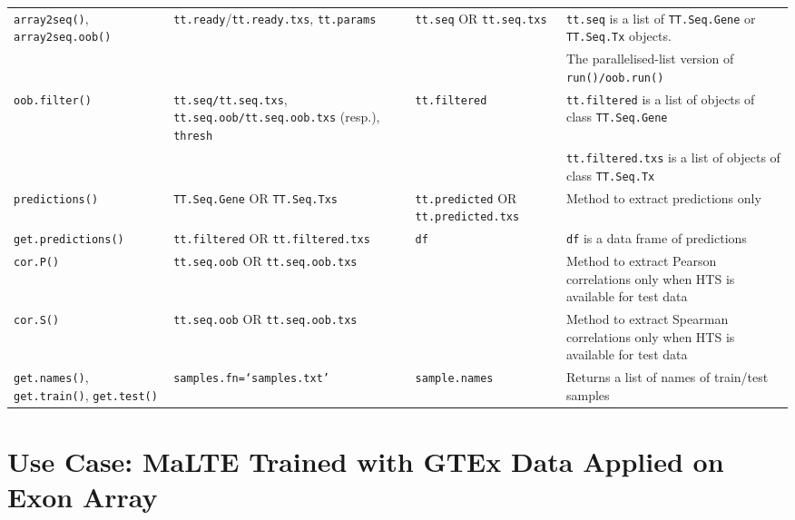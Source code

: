 \documentclass[a4paper,12pt]{article}
\begin{document}
\begin{landscape}
\begin{table}[H]
\begin{tabular}{|p{2.5cm}|p{6cm}|p{4cm}|p{5cm}|}
\hline
\texttt{array2seq()}, \texttt{array2seq.oob()} & \texttt{tt.ready}/\texttt{tt.ready.txs}, \texttt{tt.params} & \texttt{tt.seq} OR \texttt{tt.seq.txs} & \texttt{tt.seq} is a list of \texttt{TT.Seq.Gene} or \texttt{TT.Seq.Tx} objects. \\
 & & & The parallelised-list version of \texttt{run()/oob.run()} \\
\hline
\texttt{oob.filter()} & \texttt{tt.seq/tt.seq.txs}, \texttt{tt.seq.oob/tt.seq.oob.txs} (resp.), \texttt{thresh} & \texttt{tt.filtered} & \texttt{tt.filtered} is a list of objects of class \texttt{TT.Seq.Gene} \\
 & & & \texttt{tt.filtered.txs} is a list of objects of class \texttt{TT.Seq.Tx} \\
\hline
\texttt{predictions()} & \texttt{TT.Seq.Gene} OR \texttt{TT.Seq.Txs} & \texttt{tt.predicted} OR \texttt{tt.predicted.txs} & Method to extract predictions only \\
\hline
\texttt{get.predictions()} & \texttt{tt.filtered} OR \texttt{tt.filtered.txs} & \texttt{df} & \texttt{df} is a data frame of predictions \\
\hline
\texttt{cor.P()} & \texttt{tt.seq.oob} OR \texttt{tt.seq.oob.txs} &  & Method to extract Pearson correlations only when HTS is available for test data \\
\hline
\texttt{cor.S()} & \texttt{tt.seq.oob} OR \texttt{tt.seq.oob.txs} &  & Method to extract Spearman correlations only when HTS is available for test data \\
\hline
\texttt{get.names()}, \texttt{get.train()}, \texttt{get.test()} & \texttt{samples.fn=`samples.txt'} & \texttt{sample.names} & Returns a list of names of train/test samples \\
\hline
\end{tabular}
\end{table}
\end{landscape}

\pagebreak
\section{Use Case: MaLTE Trained with GTEx Data Applied on Exon Array}
\label{usecase}
\end{document}
